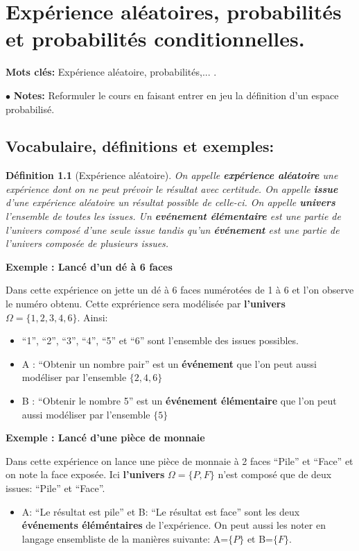 \documentclass[a4paper]{report}
\theoremstyle{break}
\newtheorem{mydef}{Définition}[chapter]
\newcounter{exem}
\newcommand{\note}{$\bullet$ \textbf{Notes: }}
\newcommand{\exemple}[1]{\textbf{Exemple \theexem: #1} \addtocounter{exem}{1} }
\begin{document}
\tableofcontents
\chapter{Expérience aléatoires, probabilités et probabilités conditionnelles.}

\textbf{Mots clés: } Expérience aléatoire, probabilités,... .

\note Reformuler le cours en faisant entrer en jeu la définition d'un
espace probabilisé. 

\section{Vocabulaire, définitions et exemples:}

\begin{mydef}[Expérience aléatoire]
  On appelle \textbf{expérience aléatoire} une expérience dont on ne peut
  prévoir le résultat avec certitude. On appelle \textbf{issue} d'une expérience
  aléatoire un résultat possible de celle-ci. On appelle \textbf{univers}
  l'ensemble de toutes les issues. Un \textbf{evénement élémentaire} est une
  partie de l'univers composé d'une seule issue tandis qu'un \textbf{événement}
  est une partie de l'univers composée de plusieurs issues. 
\end{mydef}

\exemple{Lancé d'un dé à 6 faces}

Dans cette expérience on jette un dé à 6 faces numérotées de 1 à 6 et l'on
observe le numéro obtenu. Cette exprérience sera modélisée par
\textbf{l'univers} $\Omega=\{1,2,3,4,6\}$. Ainsi:
\begin{itemize}[label = $\bullet$, leftmargin=1cm]
\item ``1'', ``2'', ``3'', ``4'', ``5'' et ``6'' sont l'ensemble des issues
  possibles.
\item A : ``Obtenir un nombre pair'' est un \textbf{événement} que l'on peut
  aussi modéliser par l'ensemble $\{2,4,6\}$
\item B : ``Obtenir le nombre 5'' est un \textbf{événement élémentaire} que l'on
  peut aussi modéliser par l'ensemble $\{5\}$
\end{itemize}

\exemple{Lancé d'une pièce de monnaie}

Dans cette expérience on lance une pièce de monnaie à 2 faces ``Pile'' et
``Face'' et on note la face exposée. Ici \textbf{l'univers} $\Omega=\{P,F\}$
n'est composé que de deux issues: ``Pile'' et ``Face''.
\begin{itemize}[label = $\bullet$, leftmargin=1cm]
\item A: ``Le résultat est pile'' et B: ``Le résultat est face'' sont les deux
  \textbf{événements éléméntaires} de l'expérience. On peut aussi les noter en
  langage ensembliste de la manières suivante: A=$\{P\}$ et B=$\{F\}$.
\end{itemize}
\end{document}
